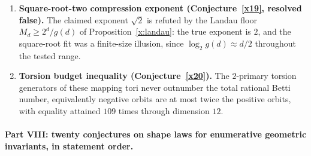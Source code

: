 \documentclass[11pt]{article}
\theoremstyle{definition}
\begin{document}
\begin{enumerate}
\item \textbf{Square-root-two compression exponent (Conjecture~\ref{x19}, resolved false).}  The claimed exponent $\sqrt2$ is refuted by the Landau floor $M_d\ge2^d/g(d)$ of Proposition~\ref{x:landau}: the true exponent is $2$, and the square-root fit was a finite-size illusion, since $\log_2g(d)\approx d/2$ throughout the tested range.
\item \textbf{Torsion budget inequality (Conjecture~\ref{x20}).}  The $2$-primary torsion generators of these mapping tori never outnumber the total rational Betti number, equivalently negative orbits are at most twice the positive orbits, with equality attained $109$ times through dimension $12$.
\end{enumerate}

\paragraph{Part VIII: twenty conjectures on shape laws for enumerative geometric invariants, in statement order.}
\end{document}

